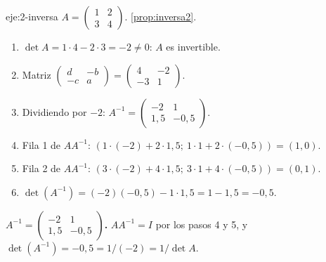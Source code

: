 \begin{solucion}{eje:2-inversa}
\datos $A=\begin{pmatrix}1&2\\3&4\end{pmatrix}$.
\planteamiento \cref{prop:inversa2}.
\pasos
\begin{enumerate}[label=\arabic*.]
  \item $\det A=1\cdot 4-2\cdot 3=-2\ne 0$: $A$ es invertible.
  \item Matriz $\begin{pmatrix}d&-b\\-c&a\end{pmatrix}=\begin{pmatrix}4&-2\\-3&1\end{pmatrix}$.
  \item Dividiendo por $-2$: $A^{-1}=\begin{pmatrix}-2&1\\1{,}5&-0{,}5\end{pmatrix}$.
  \item Fila 1 de $AA^{-1}$: $(1\cdot(-2)+2\cdot 1{,}5;\ 1\cdot 1+2\cdot(-0{,}5))=(1,0)$.
  \item Fila 2 de $AA^{-1}$: $(3\cdot(-2)+4\cdot 1{,}5;\ 3\cdot 1+4\cdot(-0{,}5))=(0,1)$.
  \item $\det(A^{-1})=(-2)(-0{,}5)-1\cdot 1{,}5=1-1{,}5=-0{,}5$.
\end{enumerate}
\resultado \textbf{$A^{-1}=\begin{pmatrix}-2&1\\1{,}5&-0{,}5\end{pmatrix}$.}
\comprobacion $AA^{-1}=I$ por los pasos 4 y 5, y $\det(A^{-1})=-0{,}5=1/(-2)=1/\det A$.
\end{solucion}

